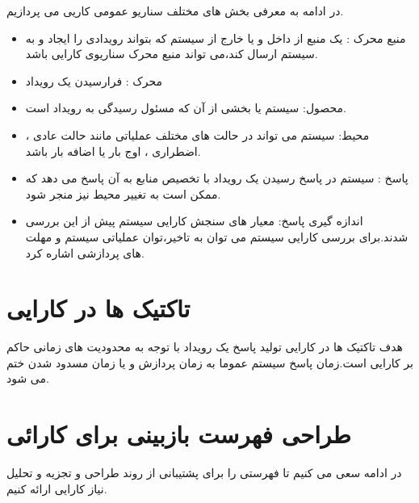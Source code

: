 در ادامه به معرفی بخش های مختلف سناریو عمومی کاریی می پردازیم.
\begin{itemize}
\item
منبع محرک :
یک منبع از داخل و یا خارج از سیستم که بتواند رویدادی را ایجاد و به سیستم ارسال کند،‌می تواند منبع محرک سناریوی کارایی باشد.
\item
محرک : 
فرارسیدن یک رویداد
\item
محصول: سیستم یا بخشی از آن که مسئول رسیدگی به رویداد است.
\item
محیط:
سیستم می تواند در حالت های مختلف عملیاتی مانند حالت عادی ، اضطراری ، اوج بار یا اضافه بار باشد.
\item
پاسخ :
سیستم در پاسخ رسیدن یک رویداد با تخصیص منابع به آن پاسخ می دهد که ممکن است به تغییر محیط نیز منجر شود.
\item
اندازه گیری پاسخ:
معیار های سنجش کارایی سیستم پیش از این بررسی شدند.برای بررسی کارایی سیستم می توان به تاخیر،‌توان عملیاتی سیستم و مهلت های پردازشی اشاره کرد.
\end{itemize}

\section{تاکتیک ها در کارایی}
هدف تاکتیک ها در کارایی تولید پاسخ یک رویداد با توجه به محدودیت های زمانی حاکم بر کارایی است.زمان پاسخ سیستم عموما به زمان پردازش و یا زمان مسدود شدن  ختم می شود.
\section{طراحی فهرست بازبینی برای کارائی}

در ادامه سعی می کنیم تا فهرستی را برای پشتیبانی از روند طراحی و تجزیه و تحلیل نیاز کارایی ارائه کنیم.


